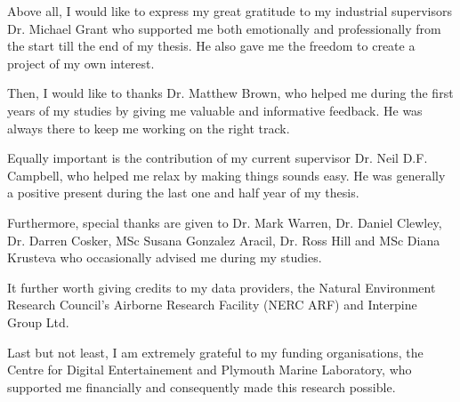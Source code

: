 \documentclass{subfiles}
\begin{document}
	\par Above all, I would like to express my great gratitude to my industrial supervisors Dr. Michael Grant who supported me both emotionally and professionally from the start till the end of my thesis. He also gave me the freedom to create a project of my own interest.
	
	\par Then, I would like to thanks Dr. Matthew Brown, who helped me during the first years of my studies by giving me valuable and informative feedback. He was always there to keep me working on the right track. 
	
	\par Equally important is the contribution of my current supervisor Dr. Neil D.F. Campbell, who helped me relax by making things sounds easy. He was generally a positive present during the last one and half year of my thesis.
	
	\par Furthermore, special thanks are given to Dr. Mark Warren, Dr.  Daniel Clewley, Dr. Darren Cosker, MSc Susana Gonzalez Aracil, Dr. Ross Hill and MSc Diana Krusteva who occasionally advised me during my studies. 
	
	\par It further worth giving credits to my data providers, the Natural Environment Research Council’s Airborne Research Facility (NERC ARF) and Interpine Group Ltd. 
	
	\par Last but not least, I am extremely grateful to my funding organisations, the Centre for Digital Entertainement and Plymouth Marine Laboratory, who supported me financially and consequently made this research possible. 
	

	
\end{document}
